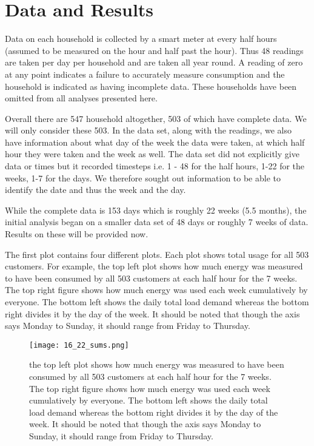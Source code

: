 \documentclass[a4paper]{article}
\begin{document}
\section{Data and Results}
Data on each household is collected by a smart meter at every half hours (assumed to be measured on the hour and half past the hour). Thus 48 readings are taken per day per household and are taken all year round. A reading of zero at any point indicates a failure to accurately measure consumption and the household is indicated as having incomplete data. These households have been omitted from all analyses presented here.

Overall there are 547 household altogether, 503 of which have complete data. We will only consider these 503. In the data set, along with the readings, we also have information about what day of the week the data were taken, at which half hour they were taken and the week as well. The data set did not explicitly give data or times but it recorded timesteps i.e. 1 - 48 for the half hours, 1-22 for the weeks, 1-7 for the days. We therefore sought out information to be able to identify the date and thus the week and the day.

While the complete data is 153 days which is roughly 22 weeks (5.5 months), the initial analysis began on a smaller data set of 48 days or roughly 7 weeks of data. Results on these will be provided now.

The first plot contains four different plots. Each plot shows total usage for all 503 customers. For example, the top left plot shows how much energy was measured to have been consumed by all 503 customers at each half hour for the 7 weeks. The top right figure shows how much energy was used each week cumulatively by everyone. The bottom left shows the daily total load demand whereas the bottom right divides it by the day of the week. It should be noted that though the axis says Monday  to Sunday, it should range from Friday to Thursday.
\begin{figure}
\centering
\texttt{[image: 16\_22\_sums.png]}
\caption{the top left plot shows how much energy was measured to have been consumed by all 503 customers at each half hour for the 7 weeks. The top right figure shows how much energy was used each week cumulatively by everyone. The bottom left shows the daily total load demand whereas the bottom right divides it by the day of the week. It should be noted that though the axis says Monday  to Sunday, it should range from Friday to Thursday.}
\label{fig:sums} 
\end{figure}
\end{document}
